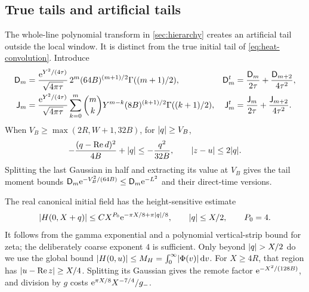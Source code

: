 \subsection{True tails and artificial tails}
The whole-line polynomial transform in \cref{sec:hierarchy} creates
an artificial tail outside the local window. It is distinct from
the true initial tail of \eqref{eq:heat-convolution}.
Introduce
\begin{subequations}\label{eq:tail-moments}
\begin{align}
 \mathsf D_m&=\frac{\mathrm e^{Y^2/(4\tau)}}{\sqrt{4\pi\tau}}\,
      2^m(64B)^{(m+1)/2}\Gamma((m+1)/2),&
 \mathsf D_m^t&=\frac{\mathsf D_m}{2\tau}
                        +\frac{\mathsf D_{m+2}}{4\tau^2},\\
 \mathsf J_m&=\frac{\mathrm e^{Y^2/(4\tau)}}{\sqrt{4\pi\tau}}
  \sum_{k=0}^m\binom{m}{k}Y^{m-k}
                 (8B)^{(k+1)/2}\Gamma((k+1)/2),&
 \mathsf J_m^t&=\frac{\mathsf J_m}{2\tau}
                        +\frac{\mathsf J_{m+2}}{4\tau^2}.
\end{align}
\end{subequations}
When \(V_B\ge\max(2R,W+1,32B)\), for \(\lvert q\rvert\ge V_B\),
\[
 -\frac{(q-\operatorname{Re} d)^2}{4B}+\lvert q\rvert\le-\frac{q^2}{32B},
 \qquad \lvert z-u\rvert\le2\lvert q\rvert.
\]
Splitting the last Gaussian in half and extracting its value at
\(V_B\) gives the tail moment bounds
\(\mathsf D_m\mathrm e^{-V_B^2/(64B)}\le\mathsf D_m\mathrm e^{-L^2}\)
and their direct-time versions.

The real canonical initial field has the height-sensitive estimate
\[
 \lvert H(0,X+q)\rvert
 \le C X^{P_0}\mathrm e^{-\pi X/8+\pi\lvert q\rvert/8},
 \qquad \lvert q\rvert\le X/2,\qquad P_0=4.
\]
It follows from the gamma exponential and a polynomial vertical-strip
bound for zeta; the deliberately coarse exponent \(4\) is sufficient.
Only beyond \(\lvert q\rvert>X/2\) do we use the global bound
\(\lvert H(0,u)\rvert\le M_H=\int_0^\infty\lvert \Phi(v)\rvert\,\mathrm d v\).
For \(X\ge4R\), that region has
\(\lvert u-\operatorname{Re} z\rvert\ge X/4\). Splitting its Gaussian gives the
remote factor \(\mathrm e^{-X^2/(128B)}\), and division by \(g\)
costs \(\mathrm e^{\pi X/8}X^{-7/4}/g_-\).

